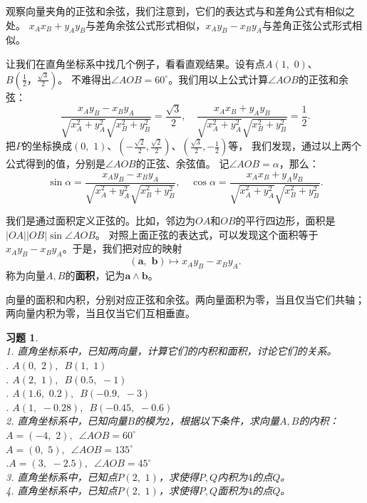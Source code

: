 \documentclass[12pt,UTF8]{ctexbook}
\newtheorem{xt}{习题}[section]
\begin{document}
观察向量夹角的正弦和余弦，我们注意到，它们的表达式与和差角公式有相似之处。
$x_Ax_B + y_Ay_B$与差角余弦公式形式相似，$x_Ay_B - x_By_A$与差角正弦公式形式相似。

让我们在直角坐标系中找几个例子，看看直观结果。设有点$A(1,\,\,0)$、$B(\frac{1}{2}，\frac{\sqrt{3}}{2})$。
不难得出$\angle AOB = 60^\circ$。我们用以上公式计算$\angle AOB$的正弦和余弦：
$$ \frac{x_Ay_B - x_By_A}{\sqrt{x_A^2 + y_A^2}\sqrt{x_B^2 + y_B^2}} = \frac{\sqrt{3}}{2}, \quad \frac{x_Ax_B + y_Ay_B}{\sqrt{x_A^2 + y_A^2} \sqrt{x_B^2 + y_B^2}} = \frac{1}{2}. $$
把$P$的坐标换成$(0,\,\,1)$、$(-\frac{\sqrt{2}}{2}, \frac{\sqrt{2}}{2})$、$(\frac{\sqrt{3}}{2},-\frac{1}{2})$等，
我们发现，通过以上两个公式得到的值，分别是$\angle AOB$的正弦、余弦值。
记$\angle AOB = \alpha$，那么：
$$ \sin \alpha = \frac{x_Ay_B - x_By_A}{\sqrt{x_A^2 + y_A^2}\sqrt{x_B^2 + y_B^2}}, \quad \cos \alpha = \frac{x_Ax_B + y_Ay_B}{\sqrt{x_A^2 + y_A^2} \sqrt{x_B^2 + y_B^2}}. $$

我们是通过面积定义正弦的。比如，邻边为$OA$和$OB$的平行四边形，面积是$|OA||OB|\sin \angle AOB$。
对照上面正弦的表达式，可以发现这个面积等于$x_Ay_B - x_By_A$。于是，我们把对应的映射
$$ (\mathbf{a}, \,\,\mathbf{b}) \mapsto x_Ay_B - x_By_A. $$
称为向量$A, B$的\textbf{面积}，记为$\mathbf{a} \wedge \mathbf{b}$。

向量的面积和内积，分别对应正弦和余弦。两向量面积为零，当且仅当它们共轴；两向量内积为零，当且仅当它们互相垂直。

\begin{xt}
    \mbox{} \\
    1. 直角坐标系中，已知两向量，计算它们的内积和面积，讨论它们的关系。\\
    . $A(0,\,\, 2), \,\,\, B(1, \,\,1)$ \\
    . $A(2,\,\, 1),\,\,\,  B(0.5, \,\,-1)$ \\
    . $A(1.6,\,\, 0.2), \,\,\, B(-0.9,\,\, -3)$\\
    . $A(1, \,\,-0.28), \,\,\, B(-0.45,\,\, -0.6)$\\
    2. 直角坐标系中，已知向量$B$的模为$2$，根据以下条件，求向量$A,B$的内积：\\
     $A = (-4, \,\,2), \,\,\, \angle AOB = 60^\circ$\\
     $A= (0,\,\, 5), \,\,\,\angle AOB = 135^\circ$\\
    .$A = (3,\,\, -2.5), \,\,\,\angle AOB = 45^\circ$\\
    3. 直角坐标系中，已知点$P(2,\,\,1)$，求使得$P,Q$内积为$4$的点$Q$。\\
    4. 直角坐标系中，已知点$P(2,\,\,1)$，求使得$P,Q$面积为$4$的点$Q$。
\end{xt}
\end{document}
